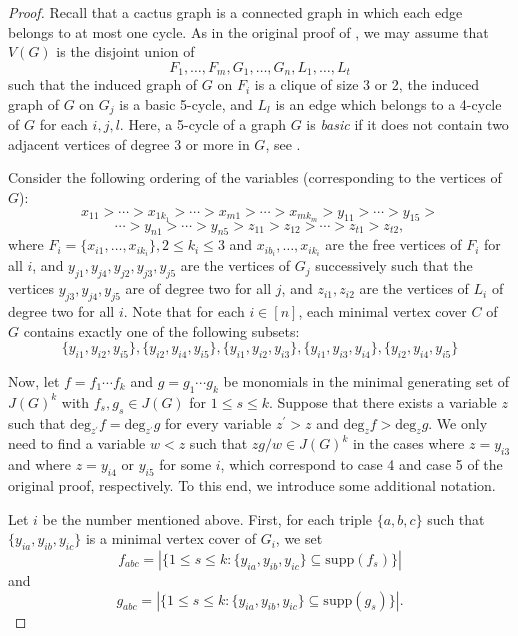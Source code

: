 \documentclass[sn-mathphys,Numbered]{sn-jnl}%
\theoremstyle{thmstyleone}%
\theoremstyle{thmstyletwo}%
\theoremstyle{thmstylethree}%
\begin{document}
\begin{proof}  Recall that  a cactus graph is a  connected graph  in which each edge  belongs to at most
one cycle.  As in the original proof of  \cite[Theorem 4.3]{M}, we may assume that $V(G)$ is the disjoint union of $$F_1,\ldots,F_m,G_1,\ldots,G_n,L_1,\ldots,L_t$$
such that the induced graph of $G$ on $F_i$ is a clique of size 3 or 2, the induced graph of $G$ on $G_j$ is a  basic 5-cycle, and $L_l$ is an edge which belongs to a 4-cycle of $G$  for each $i,j,l$. Here, a 5-cycle of a graph $G$ is {\it basic} if   it does not contain two adjacent vertices of degree 3 or more  in $G$, see \cite{HMT}.

Consider the following ordering  of the variables (corresponding to the vertices of $G$): $$x_{11} >\cdots> x_{1k_1}>\cdots> x_{m1}>\cdots>x_{mk_m}>y_{11}>\cdots>y_{15}>$$ $$\cdots>y_{n1}>\cdots>y_{n5}>z_{11}>z_{12}>\cdots>z_{t1}>z_{t2},$$ where $F_{i}=\{{x_{i1},\ldots,x_{ik_i}}\}, 2\leq k_i\leq 3$ and ${x_{ib_i},\ldots ,x_{ik_i}}$ are the free vertices of $F_{i}$ for all $i$, and $y_{j1},y_{j4},y_{j2},y_{j3},y_{j5}$ are the vertices of $G_{j}$ successively such that the vertices $y_{j3},y_{j4},y_{j5}$ are of degree two for all $j$, and $z_{i1},z_{i2}$  are the vertices of $L_{i}$ of degree two for all $i$.
 Note that  for each $i\in [n]$, each minimal vertex cover $C$ of $G$ contains exactly one of the following subsets: $$\{y_{i1},y_{i2},y_{i5}\},\{y_{i2},y_{i4},y_{i5}\},\{y_{i1},y_{i2},y_{i3}\},\{y_{i1},y_{i3},y_{i4}\},\{y_{i2},y_{i4},y_{i5}\}$$




Now, let $f=f_{1} \cdots f_{k}$ and $g=g_{1} \cdots g_{k}$ be  monomials in the minimal generating set of $J(G)^{k}$ with $f_s, g_s\in J(G)$ for $1\leq s\leq k$.  Suppose that there exists a variable $z$ such that $\mathrm{deg}_{z^{'}}f=\mathrm{deg}_{z^{'}}g$ for every variable $z^{'}>z$ and $\mathrm{deg}_{z}f>\mathrm{deg}_{z}g$. We only need to find a variable $w<z$ such that $zg/w\in J(G)^k$ in the  cases where $z=y_{i3}$ and where $z=y_{i4} \mbox{ or } y_{i5}$ for some $i$, which correspond to  case 4 and case 5 of the original proof, respectively. To this end, we introduce some additional notation.

  Let $i$ be the number mentioned above.   First,  for each  triple $\{a,b,c\}$ such that $\{y_{ia},y_{ib}, y_{ic}\}$ is a minimal vertex cover of $G_i$, we set $$f_{abc}=|\{1\leq s\leq k:\{y_{ia},y_{ib},y_{ic}\}\subseteq \mathrm{supp}(f_s) \}|$$  and
   $$ g_{abc}=|\{1\leq s\leq k:\{y_{ia},y_{ib},y_{ic}\}\subseteq \mathrm{supp}(g_s) \}|.$$





\end{proof}
\end{document}
